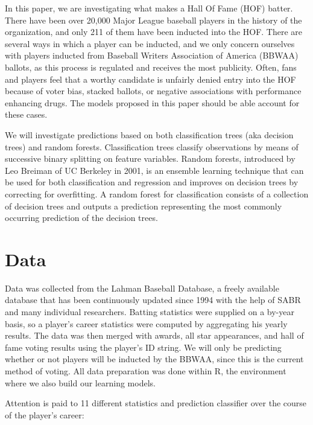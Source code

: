 \documentclass[preprint,12pt]{elsarticle}
\begin{document}
In this paper, we are investigating what makes a Hall Of Fame (HOF) batter. There have been over 20,000 Major League baseball players in the history of the organization, and only 211 of them have been inducted into the HOF. There are several ways in which a player can be inducted, and we only concern ourselves with players inducted from Baseball Writers Association of America (BBWAA) ballots, as this process is regulated and receives the most publicity. Often, fans and players feel that a worthy candidate is unfairly denied entry into the HOF because of voter bias, stacked ballots, or negative associations with performance enhancing drugs. The models proposed in this paper should be able account for these cases.

We will investigate predictions based on both classification trees (aka decision trees) and random forests. Classification trees classify observations by means of successive binary splitting on feature variables. Random forests, introduced by Leo Breiman of UC Berkeley in 2001, is an ensemble learning technique that can be used for both classification and regression and improves on decision trees by correcting for overfitting. A random forest for classification consists of a collection of decision trees and outputs a prediction representing the most commonly occurring prediction of the decision trees.

\section{Data}
\label{data}
Data was collected from the Lahman Baseball Database, a freely available database that has been continuously updated since 1994 with the help of SABR and many individual researchers. Batting statistics were supplied on a by-year basis, so a player's career statistics were computed by aggregating his yearly results. The data was then merged with awards, all star appearances, and hall of fame voting results using the player's ID string. We will only be predicting whether or not players will be inducted by the BBWAA, since this is the current method of voting. All data preparation was done within R, the environment where we also build our learning models. 

Attention is paid to 11 different statistics and prediction classifier over the course of the player's career:
\end{document}
